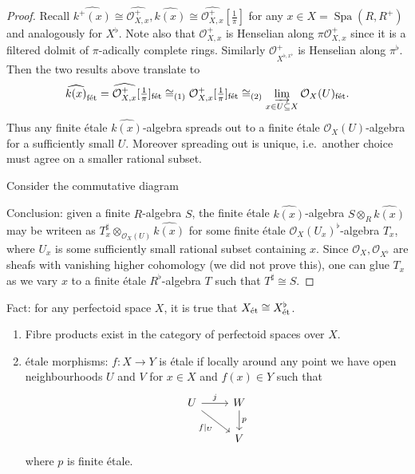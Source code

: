 \documentclass[a4paper]{article}
\newcommand{\tilt}{\flat} %
\newcommand{\sh}[1]{\mathcal{#1}} %
\DeclareMathOperator{\Spa}{Spa}
\newcommand{\sh}[1]{\mathcal{#1}} %
\DeclareMathOperator{\Spa}{Spa}
\begin{document}
\begin{proof}
  Recall \(\widehat{k^+(x)} \cong \widehat{\sh O_{X, x}^+}, \widehat{k(x)} \cong \widehat{\sh O_{X, x}^+}[\frac{1}{\pi}]\) for any \(x \in X = \Spa(R, R^+)\) and analogously for \(X^\tilt\). Note also that \(\sh O_{X, x}^+\) is Henselian along \(\pi \sh O_{X, x}^+\) since it is a filtered dolmit of \(\pi\)-adically complete rings. Similarly \(\sh O_{X^{\tilt, x^\tilt}}^+\) is Henselian along \(\pi^\tilt\). Then the two results above translate to
  \[
    \widehat{k(x)}_{\textup{fét}} = \widehat{\sh O_{X, x}^+}[\tfrac{1}{\pi}]_{\textup{fét}} \cong_{\text{(1)}} \sh O_{X, x}^+[\tfrac{1}{\pi}]_{\textup{fét}} \cong_{\text{(2)}}  \varinjlim_{x \in U \subseteq X} \sh O_X(U)_{\textup{fét}}.
  \]
  Thus any finite étale \(\widehat{k(x)}\)-algebra spreads out to a finite étale \(\sh O_X(U)\)-algebra for a sufficiently small \(U\). Moreover spreading out is unique, i.e.\ another choice must agree on a smaller rational subset.

  Consider the commutative diagram

  Conclusion: given a finite \(R\)-algebra \(S\), the finite étale \(\widehat{k(x)}\)-algebra \(S \otimes_R \widehat{k(x)}\) may be writeen as \(T_x^\sharp \otimes_{\sh O_X(U)} \widehat{k(x)}\) for some finite étale \(\sh O_X(U_x)^\tilt\)-algebra \(T_x\), where \(U_x\) is some sufficiently small rational subset containing \(x\). Since \(\sh O_X, \sh O_{X^\tilt}\) are sheafs with vanishing higher cohomology (we did not prove this), one can glue \(T_x\) as we vary \(x\) to a finite étale \(R^\tilt\)-algebra \(T\) such that \(T^\sharp \cong S\).
\end{proof}

\begin{remark}
  Fact: for any perfectoid space \(X\), it is true that \(X_{\textup{ét}} \cong X_{\textup{ét}}^\tilt\).
  \begin{enumerate}
  \item Fibre products exist in the category of perfectoid spaces over \(X\).
  \item étale morphisms: \(f: X \to Y\) is étale if locally around any point we have open neighbourhoods \(U\) and \(V\) for \(x \in X\) and \(f(x) \in Y\) such that
    \[
      \begin{tikzcd}
        U \ar[r, "j"] \ar[dr, "f|_U"'] & W \ar[d, "p"] \\
        & V
      \end{tikzcd}
    \]
    where \(p\) is finite étale.
  \end{enumerate}
\end{remark}



\printindex
\end{document}
